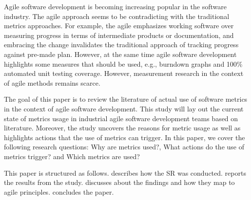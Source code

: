 \documentclass{sig-alternate}
\newcommand{\mika}[1]{\ignorespaces}
\newcommand{\eetu}[1]{\ignorespaces}
\newcommand{\juha}[1]{\ignorespaces}
\begin{document}

Agile software development is becoming increasing popular in the software
industry. The agile approach seems to be contradicting with the traditional
metrics approaches. For example, the agile emphasizes working software over
measuring progress in terms of intermediate products or documentation, and
embracing the change invalidates the traditional approach of tracking progress
against pre-made plan.
However, at the same time agile software development highlights some measures
that should be used, e.g., burndown graphs and 100\% automated unit testing
coverage. However, measurement research in the context of agile methods
remains scarce.

The goal of this paper is to review the literature of actual use of software
metrics in the context of agile software development. This study will lay out
the current state of metrics usage in industrial agile software development
teams based on literature.
Moreover, the study uncovers the reasons for metric usage as well as
highlights actions that the use of metrics can trigger.
In this paper, we cover the following research questions: Why are metrics
used?, What actions do the use of metrics trigger? and Which metrics are used?

This paper is structured as follows.  describes how
the SR was conducted.  reports the results from the study.
 discusses about the findings and how they map to agile
principles.  concludes the paper.



\end{document}
